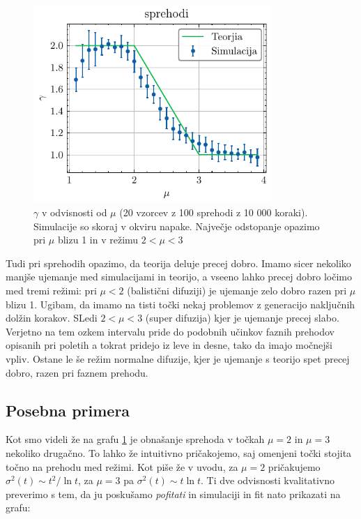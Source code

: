 \documentclass[slovene,11pt,a4paper]{article}
\begin{document}
\newpage
\begin{figure}[ht]
\begin{center}
  \includegraphics[width=9cm]{graphs/sprehodi.pdf}
  \caption{$\gamma$ v odvisnosti od $\mu$ (20 vzorcev z 100 sprehodi z 10 000 koraki). Simulacije so skoraj v okviru napake. Največje odstopanje opazimo pri $\mu$ blizu 1 in v režimu $2<\mu<3$}
  \label{fig: spre}
\end{center}
\end{figure}

Tudi pri sprehodih opazimo, da teorija deluje precej dobro. Imamo sicer nekoliko manjše ujemanje med simulacijami in teorijo, a vseeno lahko precej dobro ločimo med tremi režimi: pri $\mu<2$ (balistični difuziji) je ujemanje zelo dobro razen pri $\mu$ blizu 1. Ugibam, da imamo na tisti točki nekaj problemov z generacijo naključnih dolžin korakov. SLedi $2<\mu<3$ (super difuzija) kjer je ujemanje precej slabo. Verjetno na tem ozkem intervalu pride do podobnih učinkov faznih prehodov opisanih pri poletih a tokrat pridejo iz leve in desne, tako da imajo močnejši vpliv. Ostane le še režim normalne difuzije, kjer je ujemanje s teorijo spet precej dobro, razen pri faznem prehodu.

\subsection{Posebna primera}

Kot smo videli že na grafu \ref{fig: spre} je obnašanje sprehoda v točkah $\mu = 2$ in $\mu = 3$ nekoliko drugačno. To lahko že intuitivno pričakojemo, saj omenjeni točki stojita točno na prehodu med režimi. Kot piše že v uvodu, za $\mu=2$ pričakujemo $\sigma^2(t) \sim t^2 / \ln t$,
za $\mu=3$ pa $\sigma^2(t) \sim t \ln t$. Ti dve odvisnosti kvalitativno preverimo s tem, da ju poskušamo \textit{pofitati} in simulaciji in fit nato prikazati na grafu:
\end{document}

